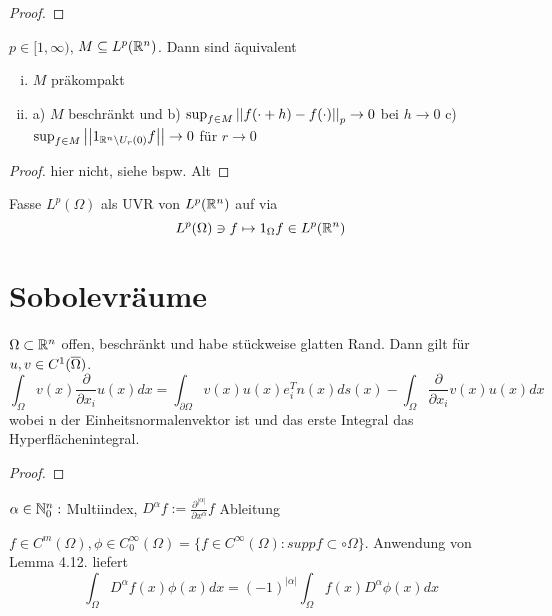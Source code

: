 	\begin{proof}
		\todor
	\end{proof}

	\begin{thm}[Präkompaktheit in $L^p$]
		$p\in[1,\infty)$, $M \subseteq L^p(\mathbb{R}^n)$. Dann sind äquivalent
		\begin{enumerate}[(i)]
			\item $M$ präkompakt
			\item a) $M$ beschränkt und 
				b) $\sup_{f\in M} \left\lvert \left\lvert f(\cdot + h) - f(\cdot) \right\rvert \right\rvert_p \to 0$ bei $h\to 0$
				c) $\sup_{f\in M} \left\lvert \left\lvert 1_{\mathbb{R}^n\backslash U_r(0)}f \right\rvert \right\rvert\to 0$ für $r\to 0$
		\end{enumerate}
	\end{thm}
	\begin{proof}
		hier nicht, siehe bspw. Alt	
	\end{proof}

	\begin{bem*}
		Fasse $L^p(\Omega)$ als UVR von $L^p(\mathbb{R}^n)$ auf via
			$$ L^p(\Omega) \ni f \mapsto 1_\Omega f \in L^p(\mathbb{R}^n)$$
	\end{bem*}

	\section{Sobolevräume}

		\begin{lemma}
			$\Omega \subset \mathbb{R}^n$ offen, beschränkt und habe stückweise glatten Rand. Dann gilt für $u,v \in C^1(\overline{\Omega})$.
				$$\int_\Omega v(x) \frac{\partial}{\partial x_i} u(x) dx = 
				\int_{\partial \Omega} v(x)u(x) e_i^T n(x) ds(x) - \int_\Omega \frac{\partial}{\partial x_i} v(x) u(x) dx$$
				wobei n der Einheitsnormalenvektor ist und das erste Integral das Hyperflächenintegral.
		\end{lemma}
		\begin{proof}
			\todor
		\end{proof}

	\begin{bem}[Notation]
		$\alpha \in \mathbb{N}_0^n:$ Multiindex, $D^\alpha f := \frac{\partial^|\alpha|}{\partial x^\alpha}f$ Ableitung
	\end{bem}

	\begin{bem}
		$f\in C^m(\Omega), \phi\in C_0^\infty(\Omega) = \{f\in C^\infty(\Omega): suppf\subset \circ\Omega\}.$ Anwendung von Lemma 4.12. liefert 
		 $$ \int_\Omega D^\alpha f(x) \phi(x) dx = (-1)^{|\alpha|}\int_\Omega f(x) D^\alpha \phi(x) dx$$ 
	\end{bem}


